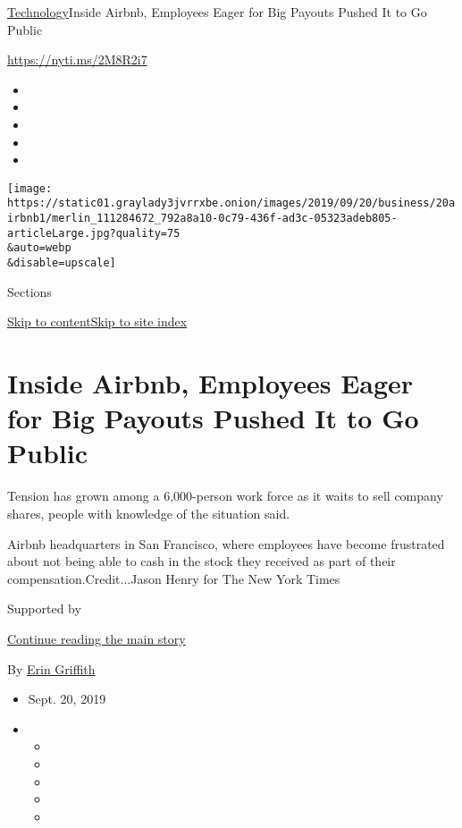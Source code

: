 \href{/section/technology}{Technology}\textbar{}Inside Airbnb, Employees
Eager for Big Payouts Pushed It to Go Public

\url{https://nyti.ms/2M8R2i7}

\begin{itemize}
\item
\item
\item
\item
\item
\end{itemize}

\texttt{[image: https://static01.graylady3jvrrxbe.onion/images/2019/09/20/business/20airbnb1/merlin\_111284672\_792a8a10-0c79-436f-ad3c-05323adeb805-articleLarge.jpg?quality=75\\\&auto=webp\\\&disable=upscale]}

Sections

\protect\hyperlink{site-content}{Skip to
content}\protect\hyperlink{site-index}{Skip to site index}

\hypertarget{inside-airbnb-employees-eager-for-big-payouts-pushed-it-to-go-public}{%
\section{Inside Airbnb, Employees Eager for Big Payouts Pushed It to Go
Public}\label{inside-airbnb-employees-eager-for-big-payouts-pushed-it-to-go-public}}

Tension has grown among a 6,000-person work force as it waits to sell
company shares, people with knowledge of the situation said.

Airbnb headquarters in San Francisco, where employees have become
frustrated about not being able to cash in the stock they received as
part of their compensation.Credit...Jason Henry for The New York Times

Supported by

\protect\hyperlink{after-sponsor}{Continue reading the main story}

By \href{https://www.nytimes3xbfgragh.onion/by/erin-griffith}{Erin
Griffith}

\begin{itemize}
\item
  Sept. 20, 2019
\item
  \begin{itemize}
  \item
  \item
  \item
  \item
  \item
  \end{itemize}
\end{itemize}

